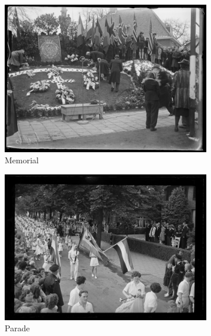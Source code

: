 \documentclass[a4paper,twoside]{article}
\begin{document}
\begin{figure}
\center
 \begin{subfigure}[b]{0.33\textwidth}
    \includegraphics[width=\textwidth]{figures/memorial.jpg}
    \caption{Memorial}
    \label{fig:examplesa}
     \vspace{0.5em}
 \end{subfigure}
 \begin{subfigure}[b]{0.33\textwidth}
    \includegraphics[width=\textwidth]{figures/parade.jpg}
    \caption{Parade}
    \label{fig:examplesb}
     \vspace{0.5em}
 \end{subfigure}
 \begin{subfigure}[b]{0.33\textwidth}

\end{subfigure}
\end{figure}
\end{document}
